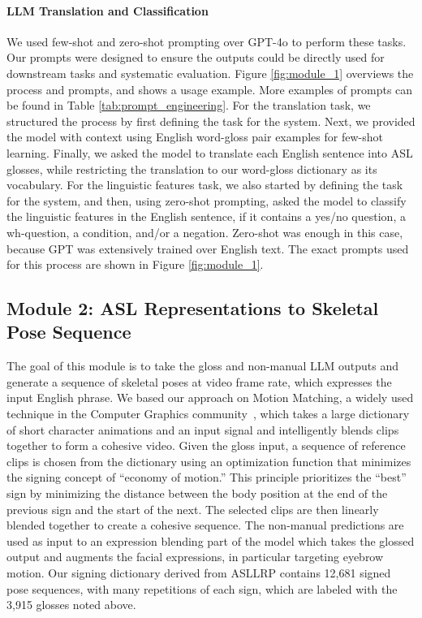 \paragraph{LLM Translation and Classification} 
We used few-shot and zero-shot prompting over GPT-4o \cite{achiam2023gpt} to perform these tasks.
Our prompts were designed to ensure the outputs could be directly used 
for downstream tasks and systematic evaluation. 
Figure \ref{fig:module_1} overviews the process and prompts, and shows a usage example. More examples of prompts can be found in Table \ref{tab:prompt_engineering}. For the translation task, we structured the process by first defining the task for the system. Next, we provided the model with context using English word-gloss pair examples for few-shot learning. Finally, we asked the model to translate each English sentence into ASL glosses, while restricting the translation to our word-gloss dictionary as its vocabulary. For the linguistic features task, we also started by defining the task for the system, and then, using zero-shot prompting, asked the model to classify the linguistic features in the English sentence, \ie if it contains a yes/no question, a wh-question, a condition, and/or a negation. Zero-shot was enough in this case, because GPT was extensively trained over English text. The exact prompts used for this process are shown in Figure \ref{fig:module_1}.

\subsection{Module 2: ASL Representations to Skeletal Pose Sequence}\label{subsubsec:module2} 
The goal of this module is to take the gloss and non-manual LLM outputs and generate a sequence of skeletal poses at video frame rate, which expresses the input English phrase. We based our approach on Motion Matching, a widely used technique in the Computer Graphics community~\cite{buttner2015motion,clavet2016motion,holden2020learned}, which takes a large dictionary of short character animations and an input signal and intelligently blends clips together to form a cohesive video. 
Given the gloss input, a sequence of reference clips is chosen from the dictionary using an optimization function that minimizes the signing concept of ``economy of motion.'' This principle prioritizes the ``best'' sign by minimizing the distance between the body position at the end of the previous sign and the start of the next. The selected clips are then linearly blended together to create a cohesive sequence. 
The non-manual predictions are used as input to an expression blending part of the model which takes the glossed output and augments the facial expressions, in particular targeting eyebrow motion. 
Our signing dictionary derived from ASLLRP contains 12,681 signed pose sequences, with many repetitions of each sign, which are labeled with the 3,915 glosses noted above. 

